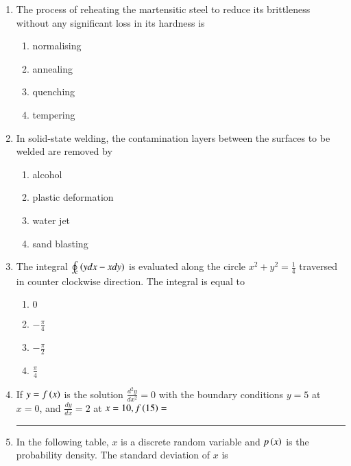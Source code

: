 \documentclass[journal]{IEEEtran}
\begin{document}
\begin{enumerate}
\item The process of reheating the martensitic steel to reduce its brittleness without any significant loss in its hardness is
\begin{multicols}{2}
\begin{enumerate}
\item normalising
\item annealing
\item quenching
\item tempering
\end{enumerate}
\end{multicols}


\item In solid-state welding, the contamination layers between the surfaces to be welded are removed by
\begin{multicols}{2}
\begin{enumerate}
\item alcohol
\item plastic deformation
\item water jet
\item sand blasting
\end{enumerate}
\end{multicols}


\item The integral $\oint_{c}\left(ydx-xdy\right)$ is evaluated along the circle $x^{2}+y^{2}=\frac{1}{4}$ traversed in counter clockwise direction. The integral is equal to
\begin{multicols}{2}
\begin{enumerate}
\item $0$
\item $-\frac{\pi}{4}$
\item $-\frac{\pi}{2}$
\item $\frac{\pi}{4}$
\end{enumerate}
\end{multicols}


\item If $y=f\left(x\right)$ is the solution $\frac{d^{2}y}{dx^{2}}=0$ with the boundary conditions $y=5$ at $x=0$, and $\frac{dy}{dx}=2$ at $x=10,f\left(15\right)=$ \rule{1cm}{0.15mm}


\item In the following table, $x$ is a discrete random variable and $p\left(x\right)$ is the probability density. The standard deviation of $x$ is


\begin{table}[h!]
\renewcommand{\thetable}{1}
    \centering
   
   \def\tablename{Table}
\end{table}



\end{enumerate}
\end{document}
